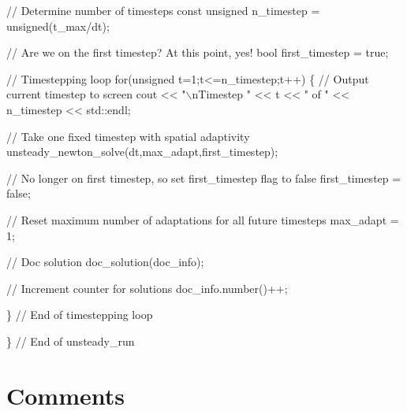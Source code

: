 \begin{DoxyCodeInclude}
 \textcolor{comment}{// Determine number of timesteps}
 \textcolor{keyword}{const} \textcolor{keywordtype}{unsigned} n\_timestep = unsigned(t\_max/dt);

 \textcolor{comment}{// Are we on the first timestep? At this point, yes!}
 \textcolor{keywordtype}{bool} first\_timestep = \textcolor{keyword}{true};

 \textcolor{comment}{// Timestepping loop}
 \textcolor{keywordflow}{for}(\textcolor{keywordtype}{unsigned} t=1;t<=n\_timestep;t++)
  \{
   \textcolor{comment}{// Output current timestep to screen}
   cout << \textcolor{stringliteral}{"\(\backslash\)nTimestep "} << t << \textcolor{stringliteral}{" of "} << n\_timestep << std::endl;
   
   \textcolor{comment}{// Take one fixed timestep with spatial adaptivity}
   unsteady\_newton\_solve(dt,max\_adapt,first\_timestep);

   \textcolor{comment}{// No longer on first timestep, so set first\_timestep flag to false}
   first\_timestep = \textcolor{keyword}{false}; 

   \textcolor{comment}{// Reset maximum number of adaptations for all future timesteps}
   max\_adapt = 1;

   \textcolor{comment}{// Doc solution}
   doc\_solution(doc\_info);

   \textcolor{comment}{// Increment counter for solutions }
   doc\_info.number()++;

  \} \textcolor{comment}{// End of timestepping loop}

\} \textcolor{comment}{// End of unsteady\_run}

\end{DoxyCodeInclude}




 

\hypertarget{index_comments}{}\section{Comments}\label{index_comments}

